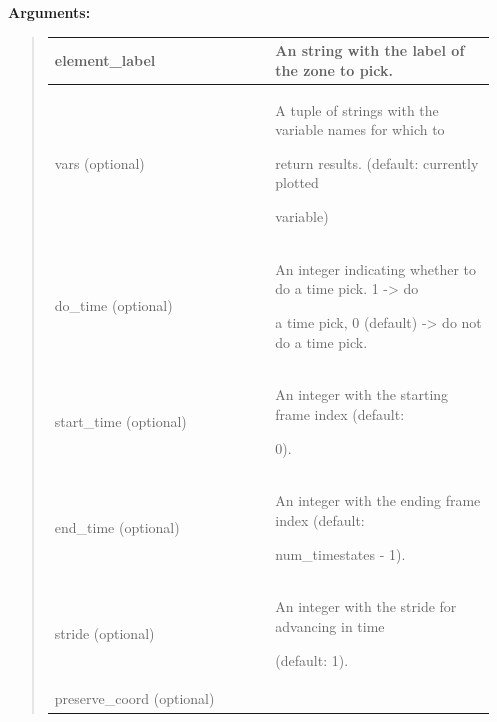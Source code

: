 \documentclass[letterpaper,10pt,english]{sphinxmanual}
\begin{document}
\begin{DUlineblock}{0em}
\item[] 
\item[] \textbf{Arguments:}
\end{DUlineblock}
\begin{quote}

\begin{tabular}{|p{0.475\linewidth}|p{0.475\linewidth}|}
\hline

element\_label
 & 
An string with the label of the zone to pick.
\\
\hline
vars (optional)
 & 
\begin{DUlineblock}{0em}
\item[] A tuple of strings with the variable names for which to
\item[] return results. (default: currently plotted
\item[] variable)
\end{DUlineblock}
\\
\hline
do\_time (optional)
 & 
\begin{DUlineblock}{0em}
\item[] An integer indicating whether to do a time pick. 1 -\textgreater{} do
\item[] a time pick, 0 (default) -\textgreater{} do not do a time pick.
\end{DUlineblock}
\\
\hline
start\_time (optional)
 & 
\begin{DUlineblock}{0em}
\item[] An integer with the starting frame index (default:
\item[] 0).
\end{DUlineblock}
\\
\hline
end\_time (optional)
 & 
\begin{DUlineblock}{0em}
\item[] An integer with the ending frame index (default:
\item[] num\_timestates - 1).
\end{DUlineblock}
\\
\hline
stride (optional)
 & 
\begin{DUlineblock}{0em}
\item[] An integer with the stride for advancing in time
\item[] (default: 1).
\end{DUlineblock}
\\
\hline
preserve\_coord (optional)
 & 
\begin{DUlineblock}{0em}

\end{DUlineblock}
\end{tabular}
\end{quote}
\end{document}
